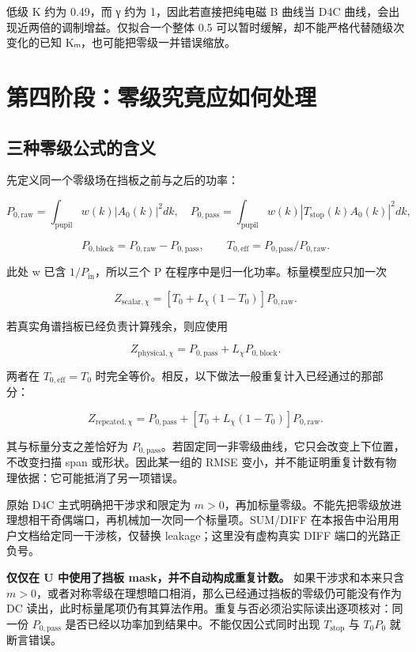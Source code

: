 \documentclass[
  chinese,
  UTF8,
  a4paper,
  11pt]{ctexart}
\begin{document}
低级 K 约为 0.49，而 γ 约为 1，因此若直接把纯电磁 B 曲线当 D4C
曲线，会出现近两倍的调制增益。仅拟合一个整体 0.5
可以暂时缓解，却不能严格代替随级次变化的已知
Kₘ，也可能把零级一并错误缩放。

\section{第四阶段：零级究竟应如何处理}\label{ux7b2cux56dbux9636ux6bb5ux96f6ux7ea7ux7a76ux7adfux5e94ux5982ux4f55ux5904ux7406}

\subsection{三种零级公式的含义}\label{ux4e09ux79cdux96f6ux7ea7ux516cux5f0fux7684ux542bux4e49}

先定义同一个零级场在挡板之前与之后的功率：

\[P_{0,\mathrm{raw}}=\int_{\mathrm{pupil}}w(k)|A_0(k)|^2dk,\quad
P_{0,\mathrm{pass}}=\int_{\mathrm{pupil}}w(k)|T_{\mathrm{stop}}(k)A_0(k)|^2dk,\]

\[P_{0,\mathrm{block}}=P_{0,\mathrm{raw}}-P_{0,\mathrm{pass}},\qquad T_{0,\mathrm{eff}}=P_{0,\mathrm{pass}}/P_{0,\mathrm{raw}}.\]

此处 w 已含 \(1/P_{\mathrm{in}}\)，所以三个 P
在程序中是归一化功率。标量模型应只加一次

\[\boxed{Z_{\mathrm{scalar},\chi}=[T_0+L_\chi(1-T_0)]P_{0,\mathrm{raw}}.}\]

若真实角谱挡板已经负责计算残余，则应使用

\[\boxed{Z_{\mathrm{physical},\chi}=P_{0,\mathrm{pass}}+L_\chi P_{0,\mathrm{block}}.}\]

两者在 \(T_{0,\mathrm{eff}}=T_0\)
时完全等价。相反，以下做法一般重复计入已经通过的那部分：

\[Z_{\mathrm{repeated},\chi}=P_{0,\mathrm{pass}}+[T_0+L_\chi(1-T_0)]P_{0,\mathrm{raw}}.\]

其与标量分支之差恰好为
\(P_{0,\mathrm{pass}}\)。若固定同一非零级曲线，它只会改变上下位置，不改变扫描
span 或形状。因此某一组的 RMSE
变小，并不能证明重复计数有物理依据：它可能抵消了另一项错误。

原始 D4C 主式明确把干涉求和限定为
\(m>0\)，再加标量零级。不能先把零级放进理想相干奇偶端口，再机械加一次同一个标量项。SUM/DIFF
在本报告中沿用用户文档给定同一干涉核，仅替换 leakage；这里没有虚构真实
DIFF 端口的光路正负号。

\textbf{仅仅在 U 中使用了挡板 mask，并不自动构成重复计数。}
如果干涉求和本来只含
\(m>0\)，或者对称零级在理想暗口相消，那么已经通过挡板的零级仍可能没有作为
DC
读出，此时标量尾项仍有其算法作用。重复与否必须沿实际读出逐项核对：同一份
\(P_{0,\mathrm{pass}}\) 是否已经以功率加到结果中。不能仅因公式同时出现
\(T_{\mathrm{stop}}\) 与 \(T_0P_0\) 就断言错误。
\end{document}
